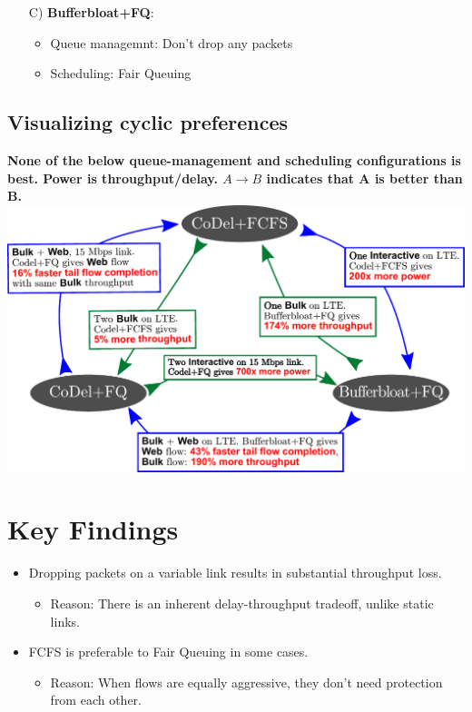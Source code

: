 {\begin{multicols}{2}
\begin{enumerate}
\item[C)] {\bf Bufferbloat+FQ}:
  \begin{itemize}
  \item Queue managemnt: Don't drop any packets
  \item Scheduling: Fair Queuing
  \end{itemize}

\end{enumerate}

\subsection*{Visualizing cyclic preferences}
\textbf{None of the below queue-management and scheduling configurations is best. Power is throughput/delay. $A\to B$ indicates that A is better than B.} \\
\includegraphics[width=\columnwidth]{fig.pdf}

\section*{Key Findings}
\begin{itemize}
\item Dropping packets on a variable link results in substantial throughput loss.
      \begin{itemize}
      \item Reason: There is an inherent delay-throughput tradeoff, unlike static links.
      \end{itemize} 
 
\item FCFS is preferable to Fair Queuing in some cases.
      \begin{itemize}
      \item Reason: When flows are equally aggressive, they don't need protection from each other.
      \end{itemize}


\end{itemize}
\end{multicols}}
